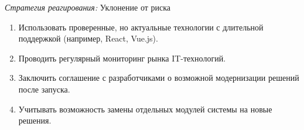 \textit{Стратегия реагирования:} Уклонение от риска

\begin{enumerate}
	\item Использовать проверенные, но актуальные технологии с длительной поддержкой (например, React, Vue.js).
	\item Проводить регулярный мониторинг рынка IT-технологий.
	\item Заключить соглашение с разработчиками о возможной модернизации решений после запуска.
	\item Учитывать возможность замены отдельных модулей системы на новые решения.
\end{enumerate}

